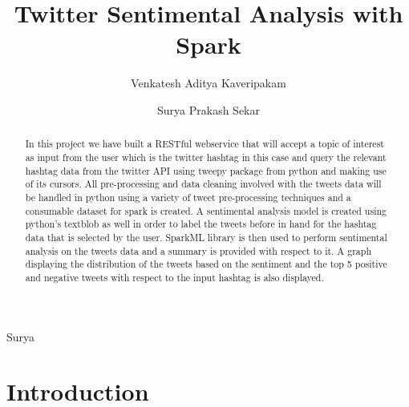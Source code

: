 

\title{Twitter Sentimental Analysis with Spark}


\author{Venkatesh Aditya Kaveripakam}

\author{Surya Prakash Sekar}

\renewcommand{\shortauthors}{Aditya}{Surya}

\begin{abstract}

In this project we have built a RESTful webservice that will accept a topic of 
interest as input from the user which is the twitter hashtag in this case and 
query the relevant hashtag data from the twitter API using tweepy package from 
python and making use of its cursors. All pre-processing and data cleaning 
involved with the tweets data will be handled in python using a variety of 
tweet pre-processing techniques and a consumable dataset for spark is created. A 
sentimental analysis model is created using python's textblob as well in order to label 
the tweets before in hand for the hashtag data that is selected by the user. 
SparkML library is then used to perform sentimental analysis on the tweets data 
and a summary is provided with respect to it. A graph displaying the 
distribution of the tweets based on the sentiment and the top 5 positive and 
negative tweets with respect to the input hashtag is also displayed.

\end{abstract}


\section{Introduction}

